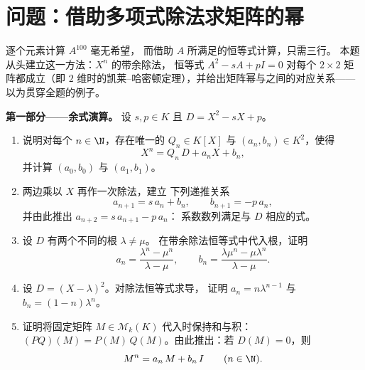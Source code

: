 \section{问题：借助多项式除法求矩阵的幂}

\begin{problem}\label{pb:b1:matrices:1}
逐个元素计算 $A^{100}$ 毫无希望，
而借助 $A$ 所满足的恒等式计算，只需三行。
本题从头建立这一方法：$X^n$ 的带余除法，
恒等式 $A^2 - sA + pI = 0$ 对每个 $2
\times 2$ 矩阵都成立（即
$2$ 维时的凯莱–哈密顿定理），并给出矩阵幂与之间的对应关系——以为贯穿全题的例子。

\medskip
\noindent\textbf{第一部分——余式演算。} 设 $s, p
\in K$ 且 $D = X^2 - sX + p$。
\begin{enumerate}
  \item 说明对每个 $n \in \N$，存在唯一的 $Q_n
        \in K[X]$ 与 $(a_n, b_n) \in K^2$，使得
        \[
        X^n = Q_n\,D + a_n X + b_n ,
        \]
        并计算 $(a_0, b_0)$ 与 $(a_1, b_1)$。
  \item 两边乘以 $X$ 再作一次除法，建立
        下列递推关系
        \[
        a_{n+1} = s\,a_n + b_n,
        \qquad
        b_{n+1} = -p\,a_n ,
        \]
        并由此推出 $a_{n+2} = s\,a_{n+1} - p\,a_n$：
        系数数列满足与
        $D$ 相应的式。
  \item 设 $D$ 有两个不同的根 $\lambda \neq \mu$。
        在带余除法恒等式中代入根，证明
        \[
        a_n = \frac{\lambda^n - \mu^n}{\lambda - \mu},
        \qquad
        b_n = \frac{\lambda\mu^n - \mu\lambda^n}{\lambda - \mu} .
        \]
  \item 设 $D = (X - \lambda)^2$。对除法恒等式求导，
        证明 $a_n = n\lambda^{n-1}$ 与
        $b_n = (1 - n)\lambda^{n}$。
  \item 证明将固定矩阵 $M \in
        \mathcal{M}_k(K)$ 代入时保持和与积：
        $(PQ)(M) = P(M)\,Q(M)$。由此推出：若 $D(M) =
        0$，则
        \[
        M^n = a_n\,M + b_n\,I \qquad (n \in \N).
        \]
\end{enumerate}


\end{problem}
